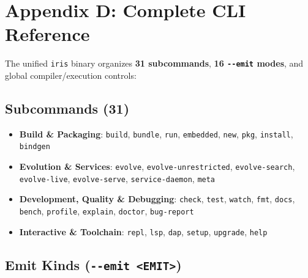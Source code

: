 \documentclass[
  english,
  oneside]{book}
\providecommand{\tightlist}{%
  \setlength{\itemsep}{0pt}\setlength{\parskip}{0pt}}
\begin{document}
\chapter{Appendix D: Complete CLI
Reference}\label{appendix-d-complete-cli-reference}

The unified \texttt{iris} binary organizes \textbf{31 subcommands},
\textbf{16 \texttt{-\/-emit} modes}, and global compiler/execution
controls:

\section{Subcommands (31)}\label{subcommands-31}

\begin{itemize}
\tightlist
\item
  \textbf{Build \& Packaging}: \texttt{build}, \texttt{bundle},
  \texttt{run}, \texttt{embedded}, \texttt{new}, \texttt{pkg},
  \texttt{install}, \texttt{bindgen}
\item
  \textbf{Evolution \& Services}: \texttt{evolve},
  \texttt{evolve-unrestricted}, \texttt{evolve-search},
  \texttt{evolve-live}, \texttt{evolve-serve}, \texttt{service-daemon},
  \texttt{meta}
\item
  \textbf{Development, Quality \& Debugging}: \texttt{check},
  \texttt{test}, \texttt{watch}, \texttt{fmt}, \texttt{docs},
  \texttt{bench}, \texttt{profile}, \texttt{explain}, \texttt{doctor},
  \texttt{bug-report}
\item
  \textbf{Interactive \& Toolchain}: \texttt{repl}, \texttt{lsp},
  \texttt{dap}, \texttt{setup}, \texttt{upgrade}, \texttt{help}
\end{itemize}

\section{\texorpdfstring{Emit Kinds
(\texttt{-\/-emit\ \textless{}EMIT\textgreater{}})}{Emit Kinds (-\/-emit \textless EMIT\textgreater)}}\label{emit-kinds---emit-emit}
\end{document}
